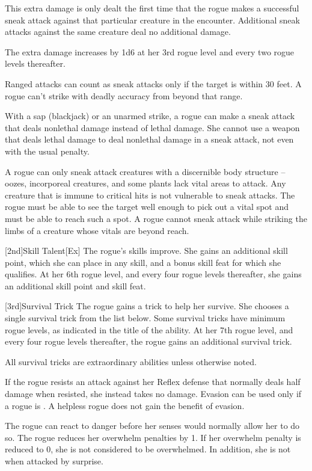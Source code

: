 This extra damage is only dealt the first time that the rogue makes a successful sneak attack against that particular creature in the encounter.
Additional sneak attacks against the same creature deal no additional damage.

The extra damage increases by 1d6 at her 3rd rogue level and every two rogue levels thereafter.

\par Ranged attacks can count as sneak attacks only if the target is within 30 feet.
A rogue can't strike with deadly accuracy from beyond that range.

With a sap (blackjack) or an unarmed strike, a rogue can make a sneak attack that deals nonlethal damage instead of lethal damage.
She cannot use a weapon that deals lethal damage to deal nonlethal damage in a sneak attack, not even with the usual  penalty.

A rogue can only sneak attack creatures with a discernible body structure -- oozes, incorporeal creatures, and some plants lack vital areas to attack.
Any creature that is immune to critical hits is not vulnerable to sneak attacks.
The rogue must be able to see the target well enough to pick out a vital spot and must be able to reach such a spot.
A rogue cannot sneak attack while striking the limbs of a creature whose vitals are beyond reach.

[2nd]{Skill Talent}[Ex]
The rogue's skills improve.
She gains an additional skill point, which she can place in any skill, and a bonus skill feat for which she qualifies.
At her 6th rogue level, and every four rogue levels thereafter, she gains an additional skill point and skill feat.

[3rd]{Survival Trick}
The rogue gains a trick to help her survive.
She chooses a single survival trick from the list below.
Some survival tricks have minimum rogue levels, as indicated in the title of the ability.
At her 7th rogue level, and every four rogue levels thereafter, the rogue gains an additional survival trick.

All survival tricks are extraordinary abilities unless otherwise noted.

If the rogue resists an attack against her Reflex defense that normally deals half damage when resisted, she instead takes no damage.
Evasion can be used only if a rogue is \unencumbered.
A helpless rogue does not gain the benefit of evasion.

The rogue can react to danger before her senses would normally allow her to do so.
The rogue reduces her overwhelm penalties by 1.
If her overwhelm penalty is reduced to 0, she is not considered to be overwhelmed.
In addition, she is not \unaware when attacked by surprise.

